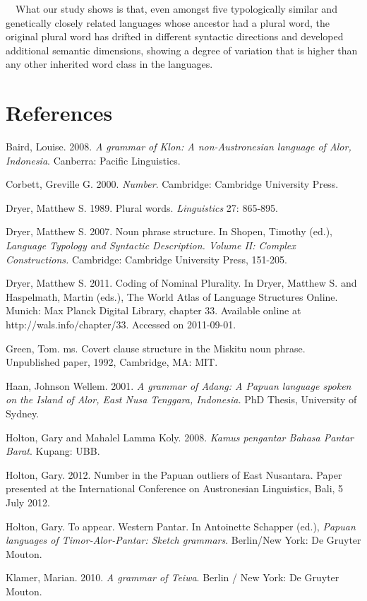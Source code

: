 \ \ What our study shows is that, even amongst five typologically similar and genetically closely related languages whose ancestor had a plural word, the original plural word has drifted in different syntactic directions and developed additional semantic dimensions, showing a degree of variation that is higher than any other inherited word class in the languages. 

\section[References]{References}
Baird, Louise. 2008. \textit{A grammar of Klon: A non-Austronesian language of Alor, Indonesia}. Canberra: Pacific Linguistics.

Corbett, Greville G. 2000. \textit{Number}. Cambridge: Cambridge University Press.

Dryer, Matthew S. 1989. Plural words.  \textit{Linguistics} 27: 865-895.

Dryer, Matthew S. 2007. Noun phrase structure. In Shopen, Timothy (ed.), \textit{Language Typology and Syntactic Description. Volume II: Complex Constructions.} Cambridge: Cambridge University Press, 151-205.

Dryer, Matthew S. 2011. Coding of Nominal Plurality. In Dryer, Matthew S. and Haspelmath, Martin (eds.), The World Atlas of Language Structures Online. Munich: Max Planck Digital Library, chapter 33. Available online at http://wals.info/chapter/33. Accessed on 2011-09-01.

Green, Tom. ms. Covert clause structure in the Miskitu noun phrase. Unpublished paper, 1992, Cambridge, MA: MIT.

Haan, Johnson Wellem. 2001. \textit{A grammar of Adang: A Papuan language spoken on the Island of Alor, East Nusa Tenggara, Indonesia.} PhD Thesis, University of Sydney.

Holton, Gary and Mahalel Lamma Koly. 2008. \textit{Kamus pengantar Bahasa Pantar Barat}. Kupang: UBB. 

Holton, Gary. 2012. Number in the Papuan outliers of East Nusantara. Paper presented at the International Conference on Austronesian Linguistics, Bali, 5 July 2012.

Holton, Gary. To appear. Western Pantar. In Antoinette Schapper (ed.), \textit{Papuan languages of Timor-Alor-Pantar: Sketch grammars}. Berlin/New York: De Gruyter Mouton.

Klamer, Marian. 2010. \textit{A grammar of Teiwa}. Berlin / New York: De Gruyter Mouton.

